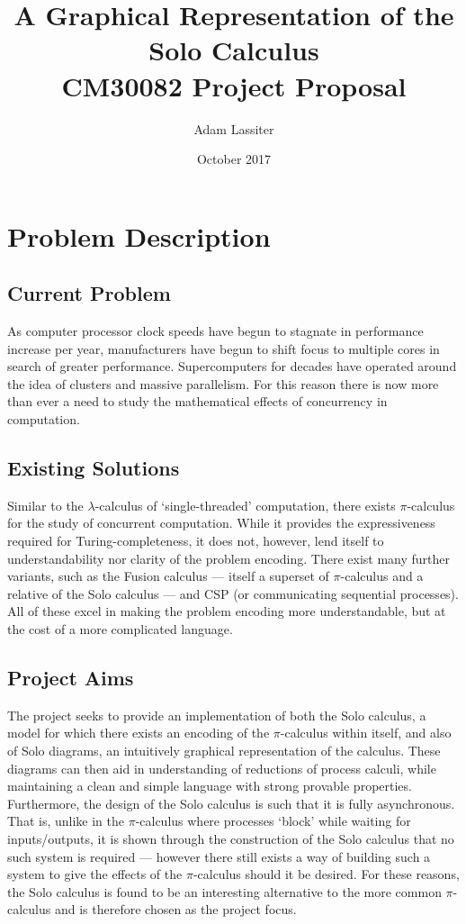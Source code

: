 \documentclass{article}
\title{A Graphical Representation of the Solo Calculus \\
	\large CM30082 Project Proposal}
\author{Adam Lassiter}
\date{October 2017}
\begin{document}
\maketitle

\vfill

\tableofcontents

\pagebreak


\section{Problem Description}
\subsection{Current Problem}
As computer processor clock speeds have begun to stagnate in performance increase per year, manufacturers have begun to shift focus to multiple cores in search of greater performance. Supercomputers for decades have operated around the idea of clusters and massive parallelism. For this reason there is now more than ever a need to study the mathematical effects of concurrency in computation.

\subsection{Existing Solutions}
Similar to the $\lambda$-calculus of `single-threaded' computation, there exists $\pi$-calculus for the study of concurrent computation. While it provides the expressiveness required for Turing-completeness, it does not, however, lend itself to understandability nor clarity of the problem encoding.
There exist many further variants, such as the Fusion calculus --- itself a superset of $\pi$-calculus and a relative of the Solo calculus --- and CSP (or communicating sequential processes). All of these excel in making the problem encoding more understandable, but at the cost of a more complicated language.

\subsection{Project Aims}
The project seeks to provide an implementation of both the Solo calculus, a model for which there exists an encoding of the $\pi$-calculus within itself, and also of Solo diagrams, an intuitively graphical representation of the calculus. These diagrams can then aid in understanding of reductions of process calculi, while maintaining a clean and simple language with strong provable properties.
Furthermore, the design of the Solo calculus is such that it is fully asynchronous. That is, unlike in the $\pi$-calculus where processes `block' while waiting for inputs/outputs, it is shown through the construction of the Solo calculus that no such system is required --- however there still exists a way of building such a system to give the effects of the $\pi$-calculus should it be desired.
For these reasons, the Solo calculus is found to be an interesting alternative to the more common $\pi$-calculus and is therefore chosen as the project focus.
\end{document}
